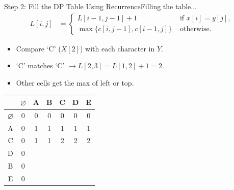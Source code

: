 \documentclass[aspectratio=169]{beamer}
\begin{document}
\begin{frame}{Step 2: Fill the DP Table Using Recurrence}{Filling the table...}
    \vspace{-10mm}
    \scriptsize
    \begin{equation*}
        \begin{align*}
            L[i, j] &=
                        \begin{cases}
                            L[i - 1, j - 1] + 1 & \text{ if } x[i] = y[j] \text{, } \\
                            \max \{ c[i, j - 1], c[i - 1, j] \} & \text{ otherwise.}
                        \end{cases}
        \end{align*}
    \end{equation*}
    \begin{itemize}
        \item Compare `C' ($X[2]$) with each character in $Y$.
        \item `C' matches `C' $\longrightarrow L[2,3] = L[1,2] + 1 = 2$.
        \item Other cells get the max of left or top.
    \end{itemize}
    \vspace{6mm}
    \normalsize
    \centering
    \begin{tabular}{|c|c|c|c|c|c|c|} \hline
                      & $\varnothing$ & A & B & C & D & E \\ \hline
        $\varnothing$ &        0      & 0 & 0 & 0 & 0 & 0 \\ \hline
               A      &        0      & 1 & 1 & 1 & 1 & 1 \\ \hline
               C      &        0      & 1 & 1 & 2 & 2 & 2 \\ \hline
               D      &        0      &   &   &   &   &   \\ \hline
               B      &        0      &   &   &   &   &   \\ \hline
               E      &        0      &   &   &   &   &   \\ \hline
    \end{tabular}
\end{frame}
\end{document}
